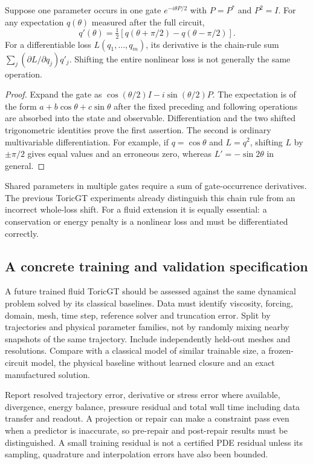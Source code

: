 \begin{proposition}
\label{prop:fluid-parameter-shift}
Suppose one parameter occurs in one gate $e^{-i\theta P/2}$ with $P=P^*$ and $P^2=I$. For any expectation $q(\theta)$ measured after the full circuit,
\[
 q'(\theta)=\tfrac12[q(\theta+\pi/2)-q(\theta-\pi/2)].
\]
For a differentiable loss $L(q_1,\ldots,q_m)$, its derivative is the chain-rule sum
$\sum_j(\partial L/\partial q_j)q'_j$. Shifting the entire nonlinear loss is not generally the same operation.
\end{proposition}
\begin{proof}
Expand the gate as $\cos(\theta/2)I-i\sin(\theta/2)P$. The expectation is of the form $a+b\cos\theta+c\sin\theta$ after the fixed preceding and following operations are absorbed into the state and observable. Differentiation and the two shifted trigonometric identities prove the first assertion. The second is ordinary multivariable differentiation. For example, if $q=\cos\theta$ and $L=q^2$, shifting $L$ by $\pm\pi/2$ gives equal values and an erroneous zero, whereas $L'=-\sin2\theta$ in general.
\end{proof}

Shared parameters in multiple gates require a sum of gate-occurrence derivatives. The previous ToricGT experiments already distinguish this chain rule from an incorrect whole-loss shift. For a fluid extension it is equally essential: a conservation or energy penalty is a nonlinear loss and must be differentiated correctly.

\subsection{A concrete training and validation specification}

A future trained fluid ToricGT should be assessed against the same dynamical problem solved by its classical baselines. Data must identify viscosity, forcing, domain, mesh, time step, reference solver and truncation error. Split by trajectories and physical parameter families, not by randomly mixing nearby snapshots of the same trajectory. Include independently held-out meshes and resolutions. Compare with a classical model of similar trainable size, a frozen-circuit model, the physical baseline without learned closure and an exact manufactured solution.

Report resolved trajectory error, derivative or stress error where available, divergence, energy balance, pressure residual and total wall time including data transfer and readout. A projection or repair can make a constraint pass even when a predictor is inaccurate, so pre-repair and post-repair results must be distinguished. A small training residual is not a certified PDE residual unless its sampling, quadrature and interpolation errors have also been bounded.

